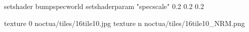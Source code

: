 setshader bumpspecworld
setshaderparam "specscale" 0.2 0.2 0.2

texture 0 noctua/tiles/16tile10.jpg
texture n noctua/tiles/16tile10_NRM.png
